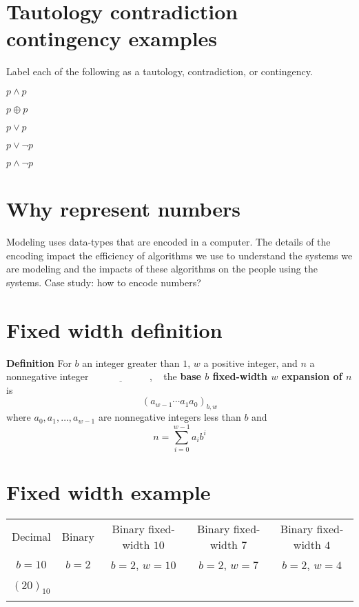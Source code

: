 \documentclass[12pt, oneside]{article}
\begin{document}
\vfill
 \vfill
\section*{Tautology contradiction contingency examples}


Label each of the following as a tautology, contradiction, or contingency.

$p \land p$

\vfill

$p \oplus p$

\vfill

$p \lor p$

\vfill

$p \lor \lnot p$

\vfill

$p \land \lnot p$

\vfill

 \vfill
\section*{Why represent numbers}


Modeling uses data-types that are encoded in a computer.
The details of the encoding impact the efficiency of algorithms
we use to understand the systems we are modeling and the 
impacts of these algorithms on the people using the systems.
Case study: how to encode numbers?

\vfill \vfill
\section*{Fixed width definition}


{\bf Definition} For $b$ an integer greater than $1$, $w$ a positive integer, 
and $n$ a nonnegative integer
$\underline{\phantom{\hspace{1in}}}$, ~
the {\bf base $b$ fixed-width $w$ expansion of $n$}  is
\[
(a_{w-1} \cdots a_1 a_0)_{b,w}
\]
where  $a_0, a_1, \ldots, a_{w-1}$ are nonnegative integers less than $b$ and
\[
n =  \sum_{i=0}^{w-1} a_{i} b^{i}
\]
 \vfill
\section*{Fixed width example}


\begin{center}
    \begin{tabular}{|c|c|c|c|c|}
    \hline
    Decimal &  Binary  & Binary fixed-width $10$& Binary fixed-width $7$ & Binary fixed-width $4$\\
    $b=10$ & $b=2$ & $b=2$, $w =  10$& $b=2$, $w =  7$& $b=2$, $w =  4$ \\
    \hline 
    &&&&  \\
    $(20)_{10}$&\phantom{$(10100)_{2}$\qquad\qquad}&&  &\\
    &&&&  \\
\hline
    \end{tabular}
    \end{center}
 \vfill
\end{document}
